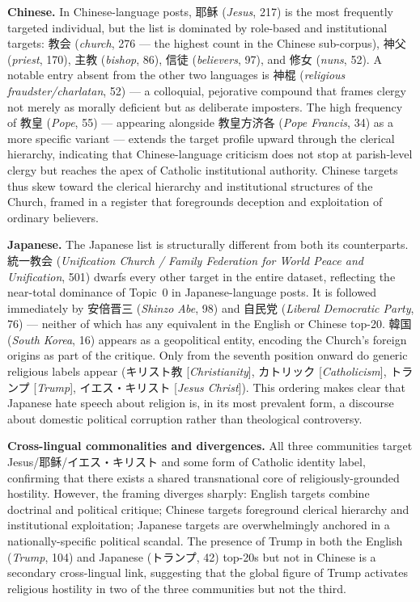 \documentclass[../CLthesis.tex]{subfiles}
\begin{document}
\textbf{Chinese.}
In Chinese-language posts, 耶稣 (\textit{Jesus}, 217) is the most frequently targeted individual, but the list is dominated by role-based and institutional targets: 教会 (\textit{church}, 276 --- the highest count in the Chinese sub-corpus), 神父 (\textit{priest}, 170), 主教 (\textit{bishop}, 86), 信徒 (\textit{believers}, 97), and 修女 (\textit{nuns}, 52). A notable entry absent from the other two languages is 神棍 (\textit{religious fraudster/charlatan}, 52) --- a colloquial, pejorative compound that frames clergy not merely as morally deficient but as deliberate imposters. The high frequency of 教皇 (\textit{Pope}, 55) --- appearing alongside 教皇方济各 (\textit{Pope Francis}, 34) as a more specific variant --- extends the target profile upward through the clerical hierarchy, indicating that Chinese-language criticism does not stop at parish-level clergy but reaches the apex of Catholic institutional authority. Chinese targets thus skew toward the clerical hierarchy and institutional structures of the Church, framed in a register that foregrounds deception and exploitation of ordinary believers.

\textbf{Japanese.}
The Japanese list is structurally different from both its counterparts. 統一教会 (\textit{Unification Church / Family Federation for World Peace and Unification}, 501) dwarfs every other target in the entire dataset, reflecting the near-total dominance of Topic~0 in Japanese-language posts. It is followed immediately by 安倍晋三 (\textit{Shinzo Abe}, 98) and 自民党 (\textit{Liberal Democratic Party}, 76) --- neither of which has any equivalent in the English or Chinese top-20. 韓国 (\textit{South Korea}, 16) appears as a geopolitical entity, encoding the Church's foreign origins as part of the critique. Only from the seventh position onward do generic religious labels appear (キリスト教 [\textit{Christianity}], カトリック [\textit{Catholicism}], トランプ [\textit{Trump}], イエス・キリスト [\textit{Jesus Christ}]). This ordering makes clear that Japanese hate speech about religion is, in its most prevalent form, a discourse about domestic political corruption rather than theological controversy.

\textbf{Cross-lingual commonalities and divergences.}
All three communities target Jesus/耶稣/イエス・キリスト and some form of Catholic identity label, confirming that there exists a shared transnational core of religiously-grounded hostility. However, the framing diverges sharply: English targets combine doctrinal and political critique; Chinese targets foreground clerical hierarchy and institutional exploitation; Japanese targets are overwhelmingly anchored in a nationally-specific political scandal. The presence of Trump in both the English (\textit{Trump}, 104) and Japanese (トランプ, 42) top-20s but not in Chinese is a secondary cross-lingual link, suggesting that the global figure of Trump activates religious hostility in two of the three communities but not the third.
\end{document}
